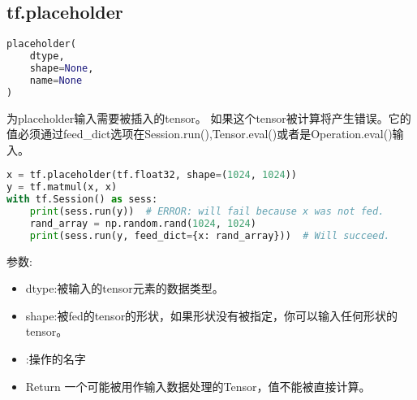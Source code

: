 \subsection{tf.placeholder}
\begin{lstlisting}[language=Python]
placeholder(
    dtype,
    shape=None,
    name=None
)
\end{lstlisting}
为placeholder输入需要被插入的tensor。
如果这个tensor被计算将产生错误。它的值必须通过feed\_dict选项在Session.run(),Tensor.eval()或者是Operation.eval()输入。
\begin{lstlisting}[language=Python]
x = tf.placeholder(tf.float32, shape=(1024, 1024))
y = tf.matmul(x, x)
with tf.Session() as sess:
    print(sess.run(y))  # ERROR: will fail because x was not fed.
    rand_array = np.random.rand(1024, 1024)
    print(sess.run(y, feed_dict={x: rand_array}))  # Will succeed.
\end{lstlisting}
参数:
\begin{itemize}
\item dtype:被输入的tensor元素的数据类型。
\item shape:被fed的tensor的形状，如果形状没有被指定，你可以输入任何形状的tensor。
\item:操作的名字
\item{Return} 一个可能被用作输入数据处理的Tensor，值不能被直接计算。
\end{itemize}
